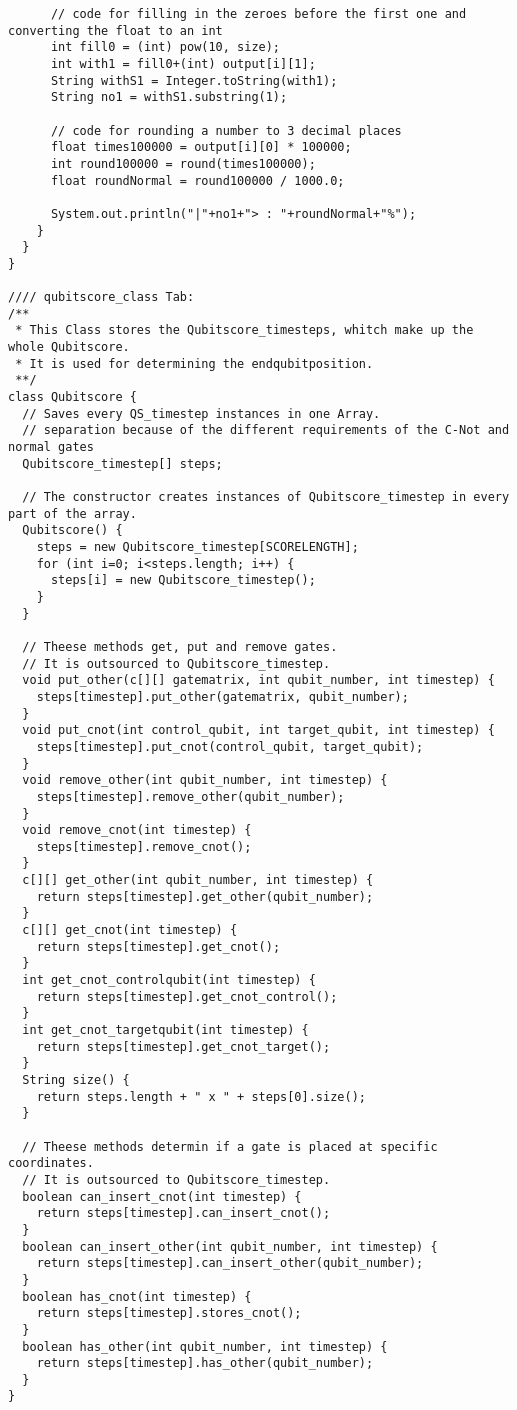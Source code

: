 \documentclass[12pt]{report}
\begin{document}
\begin{lstlisting}
      // code for filling in the zeroes before the first one and converting the float to an int
      int fill0 = (int) pow(10, size);
      int with1 = fill0+(int) output[i][1];
      String withS1 = Integer.toString(with1);
      String no1 = withS1.substring(1);

      // code for rounding a number to 3 decimal places
      float times100000 = output[i][0] * 100000;
      int round100000 = round(times100000);
      float roundNormal = round100000 / 1000.0;

      System.out.println("|"+no1+"> : "+roundNormal+"%");
    }
  }
}

//// qubitscore_class Tab:
/**
 * This Class stores the Qubitscore_timesteps, whitch make up the whole Qubitscore.
 * It is used for determining the endqubitposition.
 **/
class Qubitscore {
  // Saves every QS_timestep instances in one Array.
  // separation because of the different requirements of the C-Not and normal gates 
  Qubitscore_timestep[] steps;

  // The constructor creates instances of Qubitscore_timestep in every part of the array.
  Qubitscore() {
    steps = new Qubitscore_timestep[SCORELENGTH];
    for (int i=0; i<steps.length; i++) {
      steps[i] = new Qubitscore_timestep();
    }
  }

  // Theese methods get, put and remove gates.
  // It is outsourced to Qubitscore_timestep.
  void put_other(c[][] gatematrix, int qubit_number, int timestep) {
    steps[timestep].put_other(gatematrix, qubit_number);
  }
  void put_cnot(int control_qubit, int target_qubit, int timestep) {
    steps[timestep].put_cnot(control_qubit, target_qubit);
  }
  void remove_other(int qubit_number, int timestep) {
    steps[timestep].remove_other(qubit_number);
  }
  void remove_cnot(int timestep) {
    steps[timestep].remove_cnot();
  }
  c[][] get_other(int qubit_number, int timestep) {
    return steps[timestep].get_other(qubit_number);
  }
  c[][] get_cnot(int timestep) {
    return steps[timestep].get_cnot();
  }
  int get_cnot_controlqubit(int timestep) {
    return steps[timestep].get_cnot_control();
  }
  int get_cnot_targetqubit(int timestep) {
    return steps[timestep].get_cnot_target();
  }
  String size() {
    return steps.length + " x " + steps[0].size();
  }

  // Theese methods determin if a gate is placed at specific coordinates.
  // It is outsourced to Qubitscore_timestep.
  boolean can_insert_cnot(int timestep) {
    return steps[timestep].can_insert_cnot();
  }
  boolean can_insert_other(int qubit_number, int timestep) {
    return steps[timestep].can_insert_other(qubit_number);
  }
  boolean has_cnot(int timestep) {
    return steps[timestep].stores_cnot();
  }
  boolean has_other(int qubit_number, int timestep) {
    return steps[timestep].has_other(qubit_number);
  }
}


\end{lstlisting}
\end{document}
